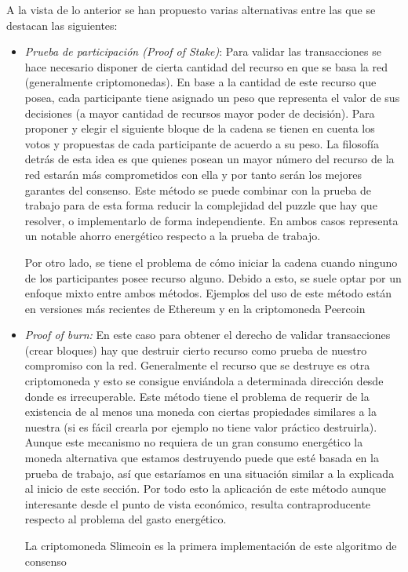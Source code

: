 A la vista de lo anterior se han propuesto varias alternativas entre las que se destacan las siguientes:
\begin{itemize}
\item \textit{Prueba de participación (Proof of Stake)}: Para validar las transacciones se hace necesario disponer de cierta cantidad del recurso en que se basa la red (generalmente criptomonedas). En base a la cantidad de este recurso que posea, cada participante tiene asignado un peso que representa el valor de sus decisiones (a mayor cantidad de recursos mayor poder de decisión). Para proponer y elegir el siguiente bloque de la cadena se tienen en cuenta los votos y propuestas de cada participante de acuerdo a su peso. La filosofía detrás de esta idea es que quienes posean un mayor número del recurso de la red estarán más comprometidos con ella y por tanto serán los mejores garantes del consenso. Este método se puede combinar con la prueba de trabajo para de esta forma reducir la complejidad del puzzle que hay que resolver, o implementarlo de forma independiente. En ambos casos representa un notable ahorro energético respecto a la prueba de trabajo.

Por otro lado, se tiene el problema de cómo iniciar la cadena cuando ninguno de los participantes posee recurso alguno. Debido a esto, se suele optar por un enfoque mixto entre ambos métodos. Ejemplos del uso de este método están en versiones más recientes de Ethereum y en la criptomoneda Peercoin \citep{pos}

\item \textit{Proof of burn:} En este caso para obtener el derecho de validar transacciones (crear bloques) hay que destruir cierto recurso como prueba de nuestro compromiso con la red. Generalmente el recurso que se destruye es otra criptomoneda y esto se consigue enviándola a determinada dirección desde donde es irrecuperable. Este método tiene el problema de requerir de la existencia de al menos una moneda con ciertas propiedades similares a la nuestra (si es fácil crearla por ejemplo no tiene valor práctico destruirla). Aunque este mecanismo no requiera de un gran consumo energético la moneda alternativa que estamos destruyendo puede que esté basada en la prueba de trabajo, así que estaríamos en una situación similar a la explicada al inicio de este sección. Por todo esto la aplicación de este método aunque interesante desde el punto de vista económico, resulta contraproducente respecto al problema del gasto energético. 

La criptomoneda Slimcoin es la primera implementación de este algoritmo de consenso \citep{pob}
\end{itemize}

